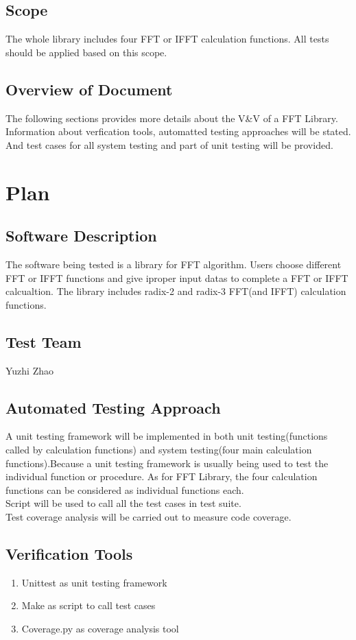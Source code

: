 \documentclass[12pt, titlepage]{article}
\begin{document}
\subsection{Scope}
The whole library includes four FFT or IFFT calculation functions. All tests should be applied based on this scope.

\subsection{Overview of Document}
The following sections provides more details about the V\&V of a FFT Library. Information about verfication tools, automatted testing approaches will be stated. And
test cases for all system testing and part of unit testing will be provided.
\section{Plan}
	
\subsection{Software Description}
The software being tested is a library for FFT algorithm. Users choose different  FFT or IFFT functions and give iproper input datas to complete a FFT or IFFT calcualtion. 
The library includes radix-2 and radix-3 FFT(and IFFT) calculation functions.
\subsection{Test Team}
Yuzhi Zhao

\subsection{Automated Testing Approach}
A unit testing framework will be implemented in both unit testing(functions called by calculation functions) and system testing(four main calculation functions).Because a unit testing framework is usually being used to test the individual function or procedure. As for FFT Library, the four calculation functions can be considered as individual functions each.\\
Script will be used to call all the test cases in test suite.\\
Test coverage analysis will be carried out to measure code coverage.\\

\subsection{Verification Tools}
\begin{enumerate}
\item {{\large Unittest} as unit testing framework}
\item {{\large Make} as script to call test cases}
\item {{\large Coverage.py} as coverage analysis tool}
\end{enumerate}
\end{document}
